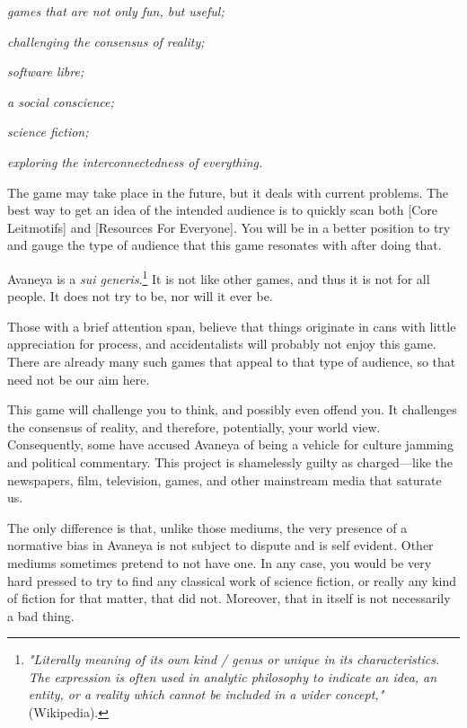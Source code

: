 \startitemize[4]
\item
{\it games that are not only fun, but useful;}
\item
{\it challenging the consensus of reality;}
\item
{\it software libre;}
\item
{\it a social conscience;}
\item
{\it science fiction;}
\item
{\it exploring the interconnectedness of everything.}
\stopitemize

The game may take place in the future, but it deals with current problems. The best way to get an idea of the intended audience is to quickly scan both [Core Leitmotifs] and [Resources For Everyone]. You will be in a better position to try and gauge the type of audience that this game resonates with after doing that. 

Avaneya is a {\it sui generis}.\footnote{{\it "Literally meaning of its own kind / genus or unique in its characteristics. The expression is often used in analytic philosophy to indicate an idea, an entity, or a reality which cannot be included in a wider concept,"} (Wikipedia).} It is not like other games, and thus it is not for all people. It does not try to be, nor will it ever be.

Those with a brief attention span, believe that things originate in cans with little appreciation for process, and accidentalists will probably not enjoy this game. There are already many such games that appeal to that type of audience, so that need not be our aim here.

This game will challenge you to think, and possibly even offend you. It challenges the consensus of reality, and therefore, potentially, your world view. Consequently, some have accused Avaneya of being a vehicle for culture jamming and political commentary. This project is shamelessly guilty as charged---like the newspapers, film, television, games, and other mainstream media that saturate us. 

The only difference is that, unlike those mediums, the very presence of a normative bias in Avaneya is not subject to dispute and is self evident. Other mediums sometimes pretend to not have one. In any case, you would be very hard pressed to try to find any classical work of science fiction, or really any kind of fiction for that matter, that did not. Moreover, that in itself is not necessarily a bad thing.

